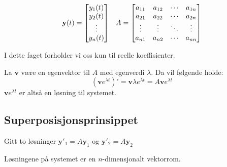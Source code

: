 \documentclass[12pt,a4paper,norsk]{article}
\makeatletter
\newcommand{\mat}[2]{\left[\begin{array}{@{}#1@{}}#2\end{array}\right]}
\newcommand{\vv}{\textbf{v}}
\newcommand{\vy}{\textbf{y}}
\makeatother
\begin{document}
\begin{align*}
  \vy(t) = \mat{c}{y_1(t) \\ y_2(t) \\ \vdots \\ y_n(t)} &
\hfill &                                                    
A = \mat{cccc}{
a_{11} & a_{12} & \cdots & a_{1n} \\
a_{21} & a_{22} & \cdots & a_{2n} \\
\vdots & \vdots & \ddots & \vdots \\
a_{n1} & a_{n2} & \cdots & a_{nn}
}
\end{align*}

I dette faget forholder vi oss kun til reelle koeffisienter.

La $\vv$ være en egenvektor til $A$ med egenverdi $\lambda$. Da vil følgende holde:
\[(\vv e^{\lambda t})' = \vv\lambda e^{\lambda t} = A\vv e^{\lambda t}\]
$\vv e^{\lambda t}$ er altså en løsning til systemet.

\subsection{Superposisjonsprinsippet}
Gitt to løsninger $\vy'_1 = A\vy_1$ og $\vy'_2 = A\vy_2$

Løsningene på systemet er en $n$-dimensjonalt vektorrom.
\end{document}
